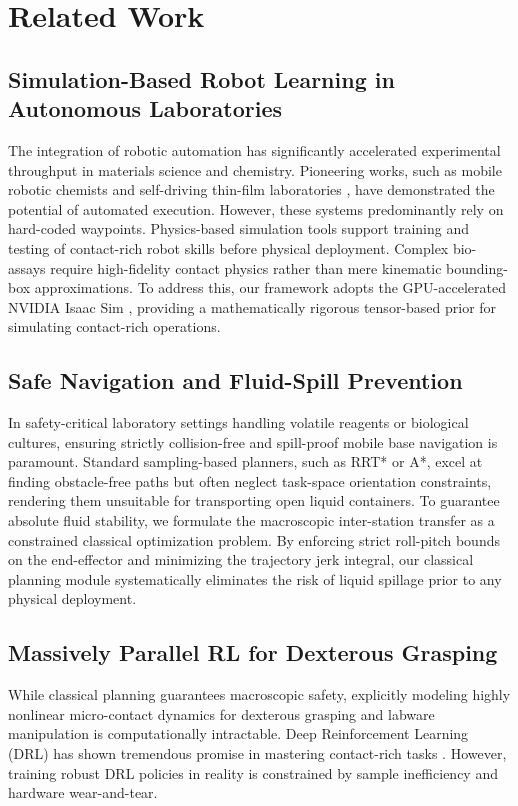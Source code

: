 \documentclass[journal,twocolumn]{IEEEtran}
\begin{document}
\section{Related Work}
\label{sec:related_work}

\subsection{Simulation-Based Robot Learning in Autonomous Laboratories}
The integration of robotic automation has significantly accelerated experimental throughput in materials science and chemistry. Pioneering works, such as mobile robotic chemists \cite{burger2020mobile} and self-driving thin-film laboratories \cite{macleod2020self}, have demonstrated the potential of automated execution. However, these systems predominantly rely on hard-coded waypoints. Physics-based simulation tools support training and testing of contact-rich robot skills before physical deployment. Complex bio-assays require high-fidelity contact physics rather than mere kinematic bounding-box approximations. To address this, our framework adopts the GPU-accelerated NVIDIA Isaac Sim \cite{makoviychuk2021isaac}, providing a mathematically rigorous tensor-based prior for simulating contact-rich operations.

\subsection{Safe Navigation and Fluid-Spill Prevention}
In safety-critical laboratory settings handling volatile reagents or biological cultures, ensuring strictly collision-free and spill-proof mobile base navigation is paramount. Standard sampling-based planners, such as RRT* or A*, excel at finding obstacle-free paths but often neglect task-space orientation constraints, rendering them unsuitable for transporting open liquid containers. To guarantee absolute fluid stability, we formulate the macroscopic inter-station transfer as a constrained classical optimization problem. By enforcing strict roll-pitch bounds on the end-effector and minimizing the trajectory jerk integral, our classical planning module systematically eliminates the risk of liquid spillage prior to any physical deployment.

\subsection{Massively Parallel RL for Dexterous Grasping}
While classical planning guarantees macroscopic safety, explicitly modeling highly nonlinear micro-contact dynamics for dexterous grasping and labware manipulation is computationally intractable. Deep Reinforcement Learning (DRL) has shown tremendous promise in mastering contact-rich tasks \cite{johannink2019residual}. However, training robust DRL policies in reality is constrained by sample inefficiency and hardware wear-and-tear.
\end{document}
